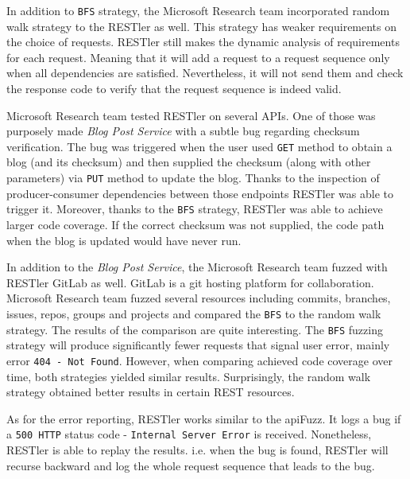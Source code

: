 In addition to \texttt{BFS} strategy, the Microsoft Research team incorporated random walk strategy to the RESTler as well. This strategy has weaker requirements on the choice of requests. RESTler still makes the dynamic analysis of requirements for each request. Meaning that it will add a request to a request sequence only when all dependencies are satisfied. Nevertheless, it will not send them and check the response code to verify that the request sequence is indeed valid.

Microsoft Research team tested RESTler on several APIs. One of those was purposely made \textit{Blog Post Service} with a subtle bug regarding checksum verification. The bug was triggered when the user used \texttt{GET} method to obtain a blog (and its checksum) and then supplied the checksum (along with other parameters) via \texttt{PUT} method to update the blog. Thanks to the inspection of producer-consumer dependencies between those endpoints RESTler was able to trigger it. Moreover, thanks to the \texttt{BFS} strategy, RESTler was able to achieve larger code coverage. If the correct checksum was not supplied, the code path when the blog is updated would have never run.

In addition to the \textit{Blog Post Service}, the Microsoft Research team fuzzed with RESTler GitLab as well. GitLab is a git hosting platform for collaboration. Microsoft Research team fuzzed several resources including commits, branches, issues, repos, groups and projects and compared the \texttt{BFS} to the random walk strategy. The results of the comparison are quite interesting. The \texttt{BFS} fuzzing strategy will produce significantly fewer requests that signal user error, mainly error \texttt{404 - Not Found}. However, when comparing achieved code coverage over time, both strategies yielded similar results. Surprisingly, the random walk strategy obtained better results in certain REST resources.

As for the error reporting, RESTler works similar to the apiFuzz. It logs a bug if a \texttt{500 HTTP} status code - \texttt{Internal Server Error} is received. Nonetheless, RESTler is able to replay the results. i.e. when the bug is found, RESTler will recurse backward and log the whole request sequence that leads to the bug.

